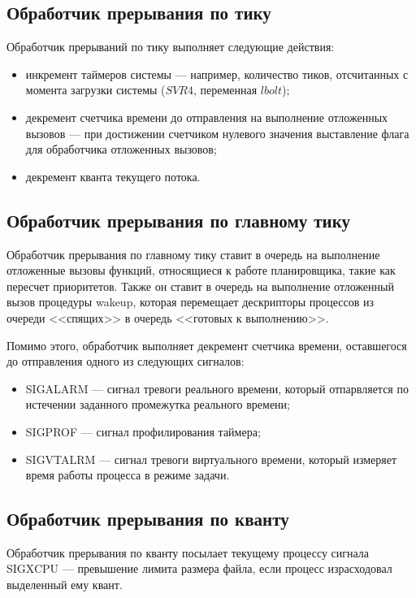 \subsection{Обработчик прерывания по тику}
Обработчик прерываний по тику выполняет следующие действия:
\begin{itemize}
	\item инкремент таймеров системы --- например, количество тиков, отсчитанных с момента загрузки системы ($SVR4$, переменная $lbolt$);
	\item декремент счетчика времени до отправления на выполнение отложенных вызовов --- при достижении счетчиком нулевого значения выставление флага для обработчика отложенных вызовов; 
	\item декремент кванта текущего потока.
\end{itemize}

\subsection{Обработчик прерывания по главному тику}
Обработчик прерывания по главному тику ставит в очередь на выполнение отложенные вызовы функций, относящиеся к работе планировщика, такие как пересчет приоритетов. Также он ставит в очередь на выполнение отложенный вызов процедуры wakeup, которая перемещает дескрипторы процессов из очереди <<спящих>> в очередь <<готовых к выполнению>>.

Помимо этого, обработчик выполняет декремент счетчика времени, оставшегося до отправления одного из следующих сигналов:
\begin{itemize}
	\item SIGALARM --- сигнал тревоги реального времени, который отпарвляется по истечении заданного промежутка реального времени;
	\item SIGPROF --- сигнал профилирования таймера;
	\item SIGVTALRM --- сигнал тревоги виртуального времени, который измеряет время работы процесса в режиме задачи.
\end{itemize}
\subsection{Обработчик прерывания по кванту}
Обработчик прерывания по кванту посылает текущему процессу сигнала  SIGXCPU --- превышение лимита размера файла, если процесс израсходовал выделенный ему квант. \newline\newline


